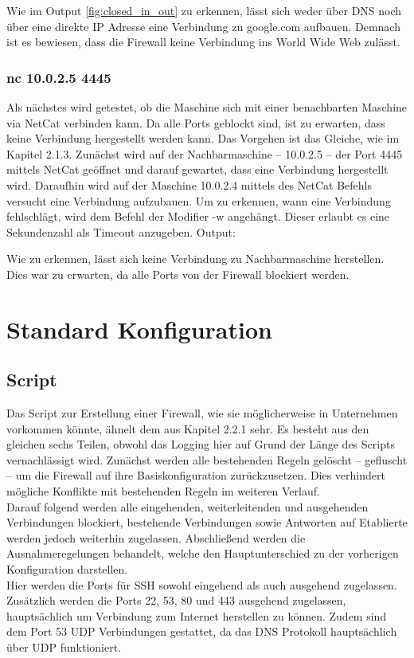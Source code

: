 Wie im Output \ref*{fig:closed_in_out} zu erkennen, lässt sich weder über DNS noch über eine direkte IP Adresse eine Verbindung zu google.com aufbauen. Demnach ist es bewiesen, dass die Firewall keine Verbindung ins World Wide Web zulässt.

\subsubsection*{nc 10.0.2.5 4445}

Als nächstes wird getestet, ob die Maschine sich mit einer benachbarten Maschine via NetCat verbinden kann. Da alle Ports geblockt sind, ist zu erwarten, dass keine Verbindung hergestellt werden kann. Das Vorgehen ist das Gleiche, wie im Kapitel 2.1.3.
Zunächst wird auf der Nachbarmaschine – 10.0.2.5 – der Port 4445 mittels NetCat geöffnet und darauf gewartet, dass eine Verbindung hergestellt wird. Daraufhin wird auf der Maschine 10.0.2.4 mittels des NetCat Befehls versucht eine Verbindung aufzubauen. Um zu erkennen, wann eine Verbindung fehlschlägt, wird dem Befehl der Modifier -w angehängt. Dieser erlaubt es eine Sekundenzahl als Timeout anzugeben.
Output:

Wie zu erkennen, lässt sich keine Verbindung zu Nachbarmaschine herstellen. Dies war zu erwarten, da alle Ports von der Firewall blockiert werden.

\newpage
\section{Standard Konfiguration}



\subsection{Script}
Das Script zur Erstellung einer Firewall, wie sie möglicherweise in Unternehmen vorkommen könnte, ähnelt dem aus Kapitel 2.2.1 sehr. 
Es besteht aus den gleichen sechs Teilen, obwohl das Logging hier auf Grund der Länge des Scripts vernachlässigt wird.
Zunächst werden alle bestehenden Regeln gelöscht – gefluscht – um die Firewall auf ihre Basiskonfiguration zurückzusetzen. Dies verhindert mögliche Konflikte mit bestehenden Regeln im weiteren Verlauf. \\
Darauf folgend werden alle eingehenden, weiterleitenden und ausgehenden Verbindungen blockiert, bestehende Verbindungen sowie Antworten auf Etablierte werden jedoch weiterhin zugelassen. 
Abschließend werden die Ausnahmeregelungen behandelt, welche den Hauptunterschied zu der vorherigen Konfiguration darstellen. \\
Hier werden die Ports für SSH sowohl eingehend als auch ausgehend zugelassen. Zusätzlich werden die Ports 22, 53, 80 und 443 ausgehend zugelassen, hauptsächlich um Verbindung zum Internet herstellen zu können. 
Zudem sind dem Port 53 UDP Verbindungen gestattet, da das DNS Protokoll hauptsächlich über UDP funktioniert. 

